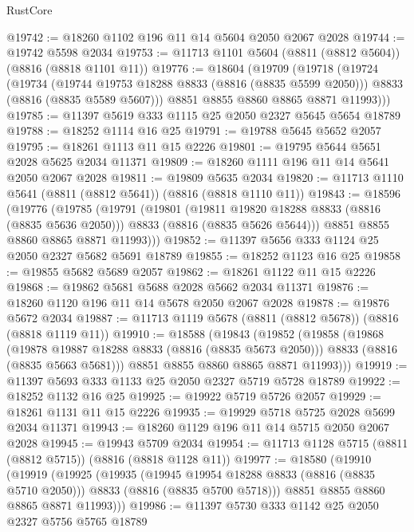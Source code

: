 \begin{lexlean}{RustCore}
\begin{coremodule}
@19742 := @18260 @1102 @196 @11 @14 @5604 @2050 @2067 @2028
@19744 := @19742 @5598 @2034
@19753 := @11713 @1101 @5604 (@8811 (@8812 @5604)) (@8816 (@8818 @1101 @11))
@19776 := @18604
    (@19709
      (@19718
        (@19724
          (@19734
            (@19744 @19753 @18288 @8833 (@8816 (@8835 @5599 @2050)))
            @8833
            (@8816 (@8835 @5589 @5607)))
          @8851
          @8855
          @8860
          @8865
          @8871
          @11993)))
@19785 := @11397 @5619 @333 @1115 @25 @2050 @2327 @5645 @5654 @18789
@19788 := @18252 @1114 @16 @25
@19791 := @19788 @5645 @5652 @2057
@19795 := @18261 @1113 @11 @15 @2226
@19801 := @19795 @5644 @5651 @2028 @5625 @2034 @11371
@19809 := @18260 @1111 @196 @11 @14 @5641 @2050 @2067 @2028
@19811 := @19809 @5635 @2034
@19820 := @11713 @1110 @5641 (@8811 (@8812 @5641)) (@8816 (@8818 @1110 @11))
@19843 := @18596
    (@19776
      (@19785
        (@19791
          (@19801
            (@19811 @19820 @18288 @8833 (@8816 (@8835 @5636 @2050)))
            @8833
            (@8816 (@8835 @5626 @5644)))
          @8851
          @8855
          @8860
          @8865
          @8871
          @11993)))
@19852 := @11397 @5656 @333 @1124 @25 @2050 @2327 @5682 @5691 @18789
@19855 := @18252 @1123 @16 @25
@19858 := @19855 @5682 @5689 @2057
@19862 := @18261 @1122 @11 @15 @2226
@19868 := @19862 @5681 @5688 @2028 @5662 @2034 @11371
@19876 := @18260 @1120 @196 @11 @14 @5678 @2050 @2067 @2028
@19878 := @19876 @5672 @2034
@19887 := @11713 @1119 @5678 (@8811 (@8812 @5678)) (@8816 (@8818 @1119 @11))
@19910 := @18588
    (@19843
      (@19852
        (@19858
          (@19868
            (@19878 @19887 @18288 @8833 (@8816 (@8835 @5673 @2050)))
            @8833
            (@8816 (@8835 @5663 @5681)))
          @8851
          @8855
          @8860
          @8865
          @8871
          @11993)))
@19919 := @11397 @5693 @333 @1133 @25 @2050 @2327 @5719 @5728 @18789
@19922 := @18252 @1132 @16 @25
@19925 := @19922 @5719 @5726 @2057
@19929 := @18261 @1131 @11 @15 @2226
@19935 := @19929 @5718 @5725 @2028 @5699 @2034 @11371
@19943 := @18260 @1129 @196 @11 @14 @5715 @2050 @2067 @2028
@19945 := @19943 @5709 @2034
@19954 := @11713 @1128 @5715 (@8811 (@8812 @5715)) (@8816 (@8818 @1128 @11))
@19977 := @18580
    (@19910
      (@19919
        (@19925
          (@19935
            (@19945 @19954 @18288 @8833 (@8816 (@8835 @5710 @2050)))
            @8833
            (@8816 (@8835 @5700 @5718)))
          @8851
          @8855
          @8860
          @8865
          @8871
          @11993)))
@19986 := @11397 @5730 @333 @1142 @25 @2050 @2327 @5756 @5765 @18789

\end{coremodule}
\end{lexlean}

